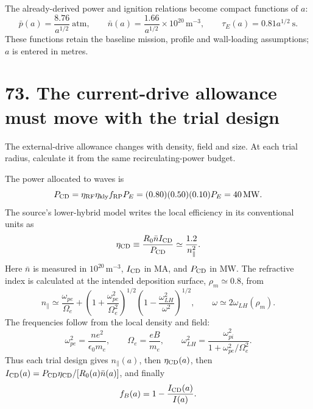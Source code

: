 \documentclass[11pt]{article}
\begin{document}
The already-derived power and ignition relations become compact functions of $a$:
\begin{equation}
 \bar p(a)=\frac{8.76}{a^{1/2}}\ \mathrm{atm},\qquad
 \bar n(a)=\frac{1.66}{a^{1/2}}\times10^{20}\,\mathrm{m^{-3}},\qquad
 \tau_E(a)=0.81a^{1/2}\ \mathrm s.
 \label{eq:freidberg-state-scan}
\end{equation}
These functions retain the baseline mission, profile and wall-loading assumptions;
$a$ is entered in metres.

\section*{73. The current-drive allowance must move with the trial design}

The external-drive allowance changes with density, field and size. At each trial
radius, calculate it from the same recirculating-power budget.

The power allocated to waves is
\begin{equation}
 P_{\rm CD}=\eta_{\rm RF}\eta_{\rm kly}f_{\rm RP}P_E
 =(0.80)(0.50)(0.10)P_E=40\,\mathrm{MW}.
 \label{eq:current-drive-power-scan}
\end{equation}
The source's lower-hybrid model writes the local efficiency in its conventional
units as
\begin{equation}
 \eta_{\rm CD}\equiv\frac{R_0\bar n I_{\rm CD}}{P_{\rm CD}}
 \simeq\frac{1.2}{n_\parallel^2}.
 \label{eq:freidberg-current-drive-efficiency}
\end{equation}
Here $\bar n$ is measured in $10^{20}\,\mathrm{m^{-3}}$, $I_{\rm CD}$ in MA, and
$P_{\rm CD}$ in MW. The refractive index is calculated at the intended deposition
surface, $\rho_m\simeq0.8$, from
\begin{equation}
 n_\parallel\simeq\frac{\omega_{pe}}{\Omega_e}
 +\left(1+\frac{\omega_{pe}^2}{\Omega_e^2}\right)^{1/2}
 \left(1-\frac{\omega_{LH}^2}{\omega^2}\right)^{1/2},
 \qquad \omega\simeq2\omega_{LH}(\rho_m).
 \label{eq:freidberg-nparallel}
\end{equation}
The frequencies follow from the local density and field:
\begin{equation}
 \omega_{pe}^2=\frac{ne^2}{\epsilon_0m_e},\qquad
 \Omega_e=\frac{eB}{m_e},\qquad
 \omega_{LH}^2=\frac{\omega_{pi}^2}{1+\omega_{pe}^2/\Omega_e^2}.
 \label{eq:lower-hybrid-frequencies}
\end{equation}
Thus each trial design gives $n_\parallel(a)$, then $\eta_{\rm CD}(a)$, then
$I_{\rm CD}(a)=P_{\rm CD}\eta_{\rm CD}/[R_0(a)\bar n(a)]$, and finally
\begin{equation}
 f_B(a)=1-\frac{I_{\rm CD}(a)}{I(a)}.
 \label{eq:bootstrap-demand-scan}
\end{equation}
\end{document}
